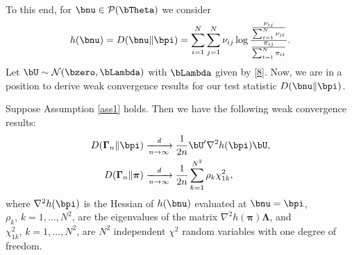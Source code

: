 \documentclass[10pt, twocolumn]{IEEEtran}
\begin{document}
To this end, for ${\bnu} \in
  \mathcal{P}( {\bTheta} )$ we consider
\begin{align}
  h( {\bnu} ) = {D}( {{\bnu} \|
        {\bpi} } ) = \sum\limits_{i = 1}^N
  {\sum\limits_{j = 1}^N {{\nu _{ij}}\log \frac{{\frac{{{\nu
                _{ij}}}}{{\sum\nolimits_{t = 1}^N {{\nu _{it}}}
            }}}}{{\frac{{{\pi _{ij}}}}{{\sum\nolimits_{t = 1}^N {{\pi
                  _{it}}} }}}}} }.
\label{90}
\end{align}
Let $\bU \sim \mathcal{N}( {\bzero, \bLambda } )$ with $\bLambda$ given
by \eqref{8}.  Now, we are in a position to derive weak convergence
results for our test statistic ${D}( {{\bnu} \|{\bpi} } )$.
\begin{thm} \label{th2} Suppose Assumption \ref{ass1} holds. Then we
  have the following weak convergence results: 
\begin{align}
D( \boldsymbol{\Gamma}_n \| \bpi ) &\xrightarrow[{n \to \infty
}]{\textit{d}}  \frac{1}{{2n}}{\bU^{\prime}}{\nabla ^2}h( {\bpi}
)\bU,  \label{336} \\ 
 D( \boldsymbol{\Gamma}_n \|
\boldsymbol{\pi} ) &\xrightarrow[{n \to \infty
}]{\textit{d}} \frac{1}{{2n}}\sum\limits_{k = 1}^{{N^2}} {{\rho _k}\chi
	_{1k}^2}, \label{chi2}
\end{align} 
where ${\nabla ^2}h( {\bpi} )$ is the Hessian of $h(\bnu)$ evaluated at
$\bnu = \bpi$, $\rho_k, \, k = 1, \ldots, N^2$, are the eigenvalues of
the matrix ${\nabla ^2}h( {\boldsymbol{\pi}} )\boldsymbol{\Lambda}$, and
$\chi _{1k}^2, \, k = 1, \ldots, N^2$, are $N^2$ independent $\chi^2$
random variables with one degree of freedom.
\end{thm}
\end{document}
